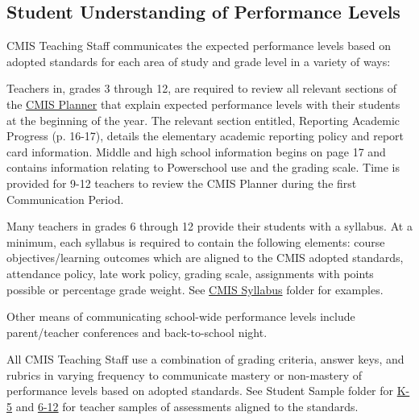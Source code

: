 \documentclass{report}
\begin{document}
\subsection{Student Understanding of Performance Levels}



\begin{findings}
CMIS Teaching Staff communicates the expected performance levels based on adopted standards for each area of study and grade level in a variety of ways:


Teachers in, grades 3 through 12, are required to review all relevant sections of the \href{https://drive.google.com/file/d/0B8vOjwyFoCioQ2tNak04WGd3Mm8/view?usp=sharing}{CMIS Planner} that explain expected performance levels with their students at the beginning of the year. The relevant section entitled, Reporting Academic Progress (p. 16-17), details the elementary academic reporting policy and report card information. Middle and high school information begins on page 17 and contains information relating to Powerschool use and the grading scale. Time is provided for 9-12 teachers to review the CMIS Planner during the first Communication Period. 


Many teachers in grades 6 through 12 provide their students with a syllabus. At a minimum, each syllabus is required to contain the following elements: course objectives/learning outcomes which are aligned to the CMIS adopted standards, attendance policy, late work policy, grading scale, assignments with points possible or percentage grade weight. See \href{https://drive.google.com/drive/folders/0ByVFfrm0zfolNmdnMzU2S2xRSWs?usp=sharing}{CMIS Syllabus} folder for examples. 

Other means of communicating school-wide performance levels include parent/teacher conferences and back-to-school night.  


All CMIS Teaching Staff use a combination of grading criteria, answer keys, and rubrics in varying frequency to communicate mastery or non-mastery of performance levels based on adopted standards. See Student Sample folder for \href{https://drive.google.com/drive/folders/0ByVFfrm0zfolVGJzdXpvLV9reVk?usp=sharing}{K-5} and  \href{https://drive.google.com/drive/folders/0ByVFfrm0zfolMkF5aThoSzZxa1E?usp=sharing}{6-12} for teacher samples of assessments aligned to the standards. 


\end{findings}
\end{document}
